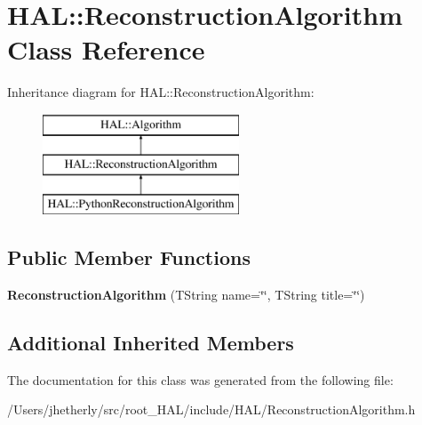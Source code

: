 \hypertarget{class_h_a_l_1_1_reconstruction_algorithm}{\section{H\-A\-L\-:\-:Reconstruction\-Algorithm Class Reference}
\label{class_h_a_l_1_1_reconstruction_algorithm}
}
Inheritance diagram for H\-A\-L\-:\-:Reconstruction\-Algorithm\-:\begin{figure}[H]
\begin{center}
\leavevmode
\includegraphics[height=3.000000cm]{class_h_a_l_1_1_reconstruction_algorithm}
\end{center}
\end{figure}
\subsection*{Public Member Functions}
\begin{DoxyCompactItemize}
\item 
\hypertarget{class_h_a_l_1_1_reconstruction_algorithm_ab384574a47016e7b1a93097d15782672}{{\bfseries Reconstruction\-Algorithm} (T\-String name=\char`\"{}\char`\"{}, T\-String title=\char`\"{}\char`\"{})}\label{class_h_a_l_1_1_reconstruction_algorithm_ab384574a47016e7b1a93097d15782672}

\end{DoxyCompactItemize}
\subsection*{Additional Inherited Members}


The documentation for this class was generated from the following file\-:\begin{DoxyCompactItemize}
\item 
/\-Users/jhetherly/src/root\-\_\-\-H\-A\-L/include/\-H\-A\-L/Reconstruction\-Algorithm.\-h\end{DoxyCompactItemize}
